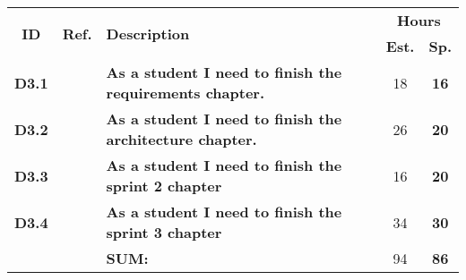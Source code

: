   \label{tab:sprint3Documentationstories}
 \def\arraystretch{1.25}
 
\begin{longtable}{ccXcc}

\toprule[0.5mm]
\multirow{2}{*}{\textbf{ID}} &
\multirow{2}{*}{\textbf{Ref.}} & \multirow{2}{*}{\textbf{Description}} & \multicolumn{2}{c}{\textbf{Hours}} \\
 					& & & \textbf{Est.} & \textbf{Sp.} \\
\midrule

\textbf{D3.1} 	&   & {\bf As a student I need to finish the requirements chapter.} 			& 	18	& \textbf{ 16} \\

\textbf{D3.2} 	&   & {\bf As a student I need to finish the architecture chapter.} 			& 	26  & \textbf{ 20} \\
	
\textbf{D3.3} 	&	& {\bf As a student I need to finish the sprint 2 chapter} 					&   16  & \textbf{20} \\

\textbf{D3.4} 	&	& {\bf As a student I need to finish the sprint 3 chapter} 					& 	34  & \textbf{30} \\


\midrule
		
				&	& \textbf{SUM:}		&		94	& \textbf{86}
 \\																			
\bottomrule[0.5mm]
\end{longtable}
